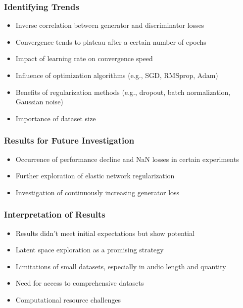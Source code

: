\begin{frame}
    \frametitle{Identifying Trends}

    \begin{itemize}
        \item Inverse correlation between generator and discriminator losses
        \item Convergence tends to plateau after a certain number of epochs
        \item Impact of learning rate on convergence speed
        \item Influence of optimization algorithms (e.g., SGD, RMSprop, Adam)
        \item Benefits of regularization methods (e.g., dropout, batch normalization, Gaussian noise)
        \item Importance of dataset size
    \end{itemize}
    
\end{frame}

\begin{frame}
    \frametitle{Results for Future Investigation}

    \begin{itemize}
        \item Occurrence of performance decline and NaN losses in certain experiments
        \item Further exploration of elastic network regularization
        \item Investigation of continuously increasing generator loss
    \end{itemize}
    
\end{frame}

\begin{frame}
    \frametitle{Interpretation of Results}

    \begin{itemize}
        \item Results didn't meet initial expectations but show potential
        \item Latent space exploration as a promising strategy
        \item Limitations of small datasets, especially in audio length and quantity
        \item Need for access to comprehensive datasets
        \item Computational resource challenges
    \end{itemize}
    
\end{frame}

